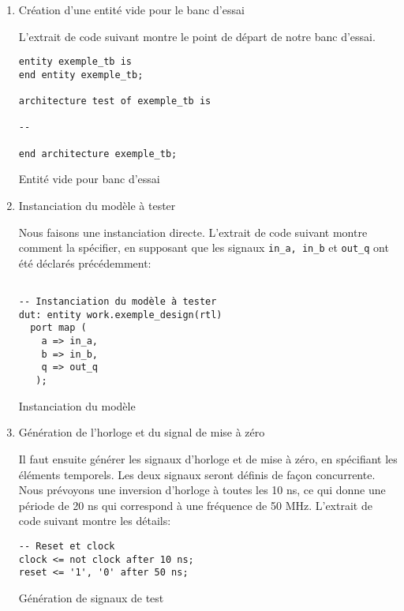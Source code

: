 \documentclass[letter, oneside]{book}
\begin{document}
\begin{enumerate}
\item Création d'une entité vide pour le banc d'essai
\label{sec:org9cd75f2}

L'extrait de code suivant montre le point de départ de notre banc
d'essai.

\begin{listing}[htbp]
\begin{verbatim}
entity exemple_tb is
end entity exemple_tb;

architecture test of exemple_tb is

--

end architecture exemple_tb;
\end{verbatim}
\caption{Entité vide pour banc d'essai}
\end{listing}

\item Instanciation du modèle à tester
\label{sec:orged2e8d0}

Nous faisons une instanciation directe. L'extrait de code suivant
montre comment la spécifier, en supposant que les signaux \texttt{in\_a, in\_b}
et \texttt{out\_q} ont été déclarés précédemment:

\begin{listing}[htbp]
\begin{verbatim}

-- Instanciation du modèle à tester 
dut: entity work.exemple_design(rtl)
  port map (
    a => in_a,
    b => in_b,
    q => out_q
   );

\end{verbatim}
\caption{Instanciation du modèle}
\end{listing}

\item Génération de l'horloge et du signal de mise à zéro
\label{sec:org1c7bf04}

Il faut ensuite générer les signaux d'horloge et de mise à zéro, en
spécifiant les éléments temporels. Les deux signaux seront définis de
façon concurrente. Nous prévoyons une inversion d'horloge à toutes les
10 ns, ce qui donne une période de 20 ns qui correspond à une
fréquence de 50 MHz. L'extrait de code suivant montre les détails:

\begin{listing}[htbp]
\begin{verbatim}
-- Reset et clock
clock <= not clock after 10 ns;
reset <= '1', '0' after 50 ns;
\end{verbatim}
\caption{Génération de signaux de test}
\end{listing}


\end{enumerate}
\end{document}
